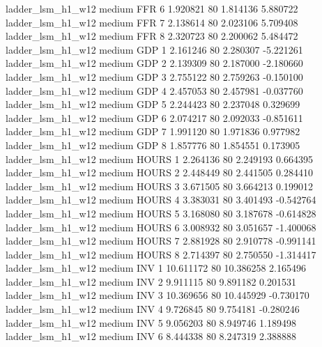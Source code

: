   ladder_lsm_h1_w12     medium      FFR                 6  1.920821 80       1.814136           5.880722
  ladder_lsm_h1_w12     medium      FFR                 7  2.138614 80       2.023106           5.709408
  ladder_lsm_h1_w12     medium      FFR                 8  2.320723 80       2.200062           5.484472
  ladder_lsm_h1_w12     medium      GDP                 1  2.161246 80       2.280307          -5.221261
  ladder_lsm_h1_w12     medium      GDP                 2  2.139309 80       2.187000          -2.180660
  ladder_lsm_h1_w12     medium      GDP                 3  2.755122 80       2.759263          -0.150100
  ladder_lsm_h1_w12     medium      GDP                 4  2.457053 80       2.457981          -0.037760
  ladder_lsm_h1_w12     medium      GDP                 5  2.244423 80       2.237048           0.329699
  ladder_lsm_h1_w12     medium      GDP                 6  2.074217 80       2.092033          -0.851611
  ladder_lsm_h1_w12     medium      GDP                 7  1.991120 80       1.971836           0.977982
  ladder_lsm_h1_w12     medium      GDP                 8  1.857776 80       1.854551           0.173905
  ladder_lsm_h1_w12     medium    HOURS                 1  2.264136 80       2.249193           0.664395
  ladder_lsm_h1_w12     medium    HOURS                 2  2.448449 80       2.441505           0.284410
  ladder_lsm_h1_w12     medium    HOURS                 3  3.671505 80       3.664213           0.199012
  ladder_lsm_h1_w12     medium    HOURS                 4  3.383031 80       3.401493          -0.542764
  ladder_lsm_h1_w12     medium    HOURS                 5  3.168080 80       3.187678          -0.614828
  ladder_lsm_h1_w12     medium    HOURS                 6  3.008932 80       3.051657          -1.400068
  ladder_lsm_h1_w12     medium    HOURS                 7  2.881928 80       2.910778          -0.991141
  ladder_lsm_h1_w12     medium    HOURS                 8  2.714397 80       2.750550          -1.314417
  ladder_lsm_h1_w12     medium      INV                 1 10.611172 80      10.386258           2.165496
  ladder_lsm_h1_w12     medium      INV                 2  9.911115 80       9.891182           0.201531
  ladder_lsm_h1_w12     medium      INV                 3 10.369656 80      10.445929          -0.730170
  ladder_lsm_h1_w12     medium      INV                 4  9.726845 80       9.754181          -0.280246
  ladder_lsm_h1_w12     medium      INV                 5  9.056203 80       8.949746           1.189498
  ladder_lsm_h1_w12     medium      INV                 6  8.444338 80       8.247319           2.388888
